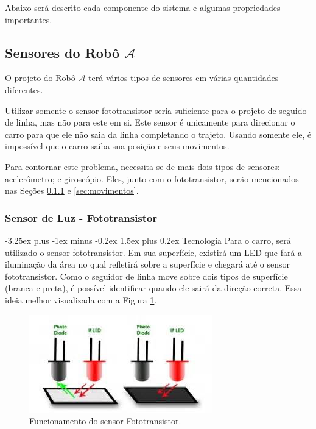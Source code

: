 \documentclass[portugues, brazil, a4paper,12pt]{article}
\makeatletter
\renewcommand{\paragraph}{\@startsection{paragraph}{4}{0ex}%
   {-3.25ex plus -1ex minus -0.2ex}%
   {1.5ex plus 0.2ex}%
   {\normalfont\normalsize\bfseries}}
\makeatother
\begin{document}
		Abaixo será descrito cada componente do sistema e algumas propriedades importantes.

	\subsection{Sensores do Robô $ \mathcal{A} $}
		O projeto do Robô $ \mathcal{A} $ terá vários tipos de sensores em várias quantidades diferentes.

		Utilizar somente o sensor fototransistor seria suficiente para o projeto de seguido de linha, mas não para este em si. Este sensor é unicamente para direcionar o carro para que ele não saia da linha completando o trajeto. Usando somente ele, é impossível que o carro saiba sua posição e seus movimentos.

		Para contornar este problema, necessita-se de mais dois tipos de sensores: acelerômetro; e giroscópio. Eles, junto com o fototransistor, serão mencionados nas Seções \ref{sec:fototransistor} e \ref{sec:movimentos}.


		\subsubsection{Sensor de Luz - Fototransistor} \label{sec:fototransistor}

			\paragraph{Tecnologia}
				Para o carro, será utilizado o sensor fototransistor. Em sua superfície, existirá um LED que fará a iluminação da área no qual refletirá sobre a superfície e chegará até o sensor fototransistor. Como o seguidor de linha move sobre dois tipos de superfície (branca e preta), é possível identificar quando ele sairá da direção correta. Essa ideia melhor visualizada com a Figura \ref{fig:ft}.

				\begin{figure}[H]
					\centering
					\includegraphics[width=0.45\linewidth]{img/elementos-fototransistor.jpg}
					\caption{Funcionamento do sensor Fototransistor.}
					\label{fig:ft}
				\end{figure}
\end{document}
